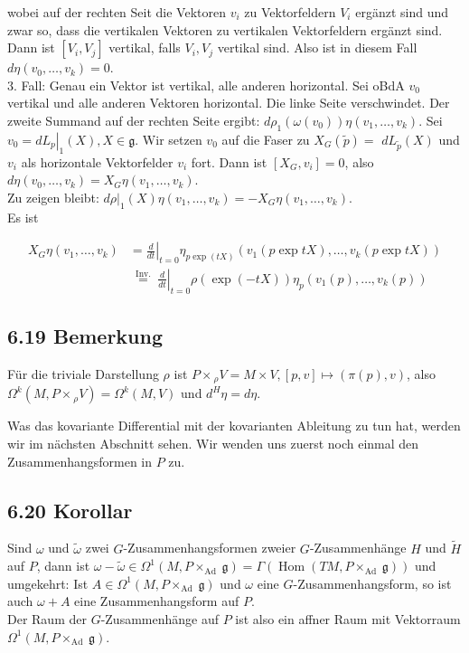wobei auf der rechten Seit die Vektoren $v_{i}$ zu Vektorfeldern $V_{i}$ ergänzt sind und zwar so, dass die vertikalen Vektoren zu vertikalen Vektorfeldern ergänzt sind. Dann ist $\left[V_{i}, V_{j}\right]$ vertikal, falls $V_{i}, V_{j}$ vertikal sind. Also ist in diesem Fall $d \eta\left(v_{0}, \ldots, v_{k}\right)=0$.\\
3. Fall: Genau ein Vektor ist vertikal, alle anderen horizontal. Sei oBdA $v_{0}$ vertikal und alle anderen Vektoren horizontal. Die linke Seite verschwindet. Der zweite Summand auf der rechten Seite ergibt: $d \rho_{1}\left(\omega\left(v_{0}\right)\right) \eta\left(v_{1}, \ldots, v_{k}\right)$. Sei $v_{0}=\left.d L_{p}\right|_{1}(X), X \in \mathfrak{g}$. Wir setzen $v_{0}$ auf die Faser zu $X_{G}(\tilde{p})=$ $d L_{\tilde{p}}(X)$ und $v_{i}$ als horizontale Vektorfelder $v_{i}$ fort. Dann ist $\left[X_{G}, v_{i}\right]=0$, also $d \eta\left(v_{0}, \ldots, v_{k}\right)=X_{G} \eta\left(v_{1}, \ldots, v_{k}\right)$.\\
Zu zeigen bleibt: $\left.d \rho\right|_{1}(X) \eta\left(v_{1}, \ldots, v_{k}\right)=-X_{G} \eta\left(v_{1}, \ldots, v_{k}\right)$.\\
Es ist

$$
\begin{aligned}
X_{G} \eta\left(v_{1}, \ldots, v_{k}\right) & =\left.\frac{d}{d t}\right|_{t=0} \eta_{p \exp (t X)}\left(v_{1}(p \exp t X), \ldots, v_{k}(p \exp t X)\right) \\
& \left.\stackrel{\text { Inv. }}{=} \frac{d}{d t}\right|_{t=0} \rho(\exp (-t X)) \eta_{p}\left(v_{1}(p), \ldots, v_{k}(p)\right)
\end{aligned}
$$

\subsection*{6.19 Bemerkung}
Für die triviale Darstellung $\rho$ ist $P \times{ }_{\rho} V=M \times V,[p, v] \mapsto(\pi(p), v)$, also $\Omega^{k}\left(M, P \times{ }_{\rho} V\right)=\Omega^{k}(M, V)$ und $d^{H} \eta=d \eta$.

Was das kovariante Differential mit der kovarianten Ableitung zu tun hat, werden wir im nächsten Abschnitt sehen. Wir wenden uns zuerst noch einmal den Zusammenhangsformen in $P$ zu.

\subsection*{6.20 Korollar}
Sind $\omega$ und $\tilde{\omega}$ zwei $G$-Zusammenhangsformen zweier $G$-Zusammenhänge $H$ und $\tilde{H}$ auf $P$, dann ist $\omega-\tilde{\omega} \in \Omega^{1}\left(M, P \times_{\text {Ad }} \mathfrak{g}\right)=\Gamma\left(\operatorname{Hom}\left(T M, P \times_{\text {Ad }} \mathfrak{g}\right)\right)$ und umgekehrt: Ist $A \in \Omega^{1}\left(M, P \times_{\text {Ad }} \mathfrak{g}\right)$ und $\omega$ eine $G$-Zusammenhangsform, so ist auch $\omega+A$ eine Zusammenhangsform auf $P$.\\
Der Raum der $G$-Zusammenhänge auf $P$ ist also ein affner Raum mit Vektorraum $\Omega^{1}\left(M, P \times_{\text {Ad }} \mathfrak{g}\right)$.

